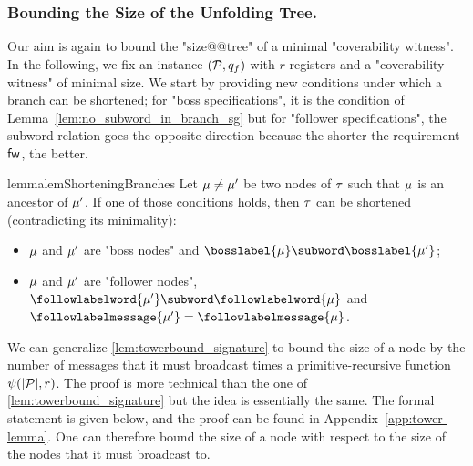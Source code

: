 \subsubsection{Bounding the Size of the Unfolding Tree.}
\label{sec:tree-bounds}

Our aim is again to bound the "size@@tree" of a minimal "coverability witness". In the following, we fix an instance $(\mathcal{P},q_f)$ with $r$ registers and a "coverability witness" of minimal size. We start by providing new conditions under which a branch can be shortened; for "boss specifications", it is the condition of Lemma~\ref{lem:no_subword_in_branch_sg} but for "follower specifications", the subword relation goes the opposite direction because the shorter the requirement $\mathsf{fw}$, the better.

\begin{restatable}{lemma}{lemShorteningBranches} 
\label{lem:shortening-branches}
	Let $\mu \ne \mu'$ be two nodes of $\tau$ such that $\mu$ is an ancestor of $\mu'$. If one of those conditions holds, then $\tau$ can be shortened  (contradicting its minimality):
	\begin{itemize}
	\item $\mu$ and $\mu'$ are "boss nodes" and $\bosslabel{\node} \subword \bosslabel{\node'}$; 
	\item $\mu$ and $\mu'$ are "follower nodes", $\followlabelword{\node'} \subword \followlabelword{\node}$ and $\followlabelmessage{\node'}=\followlabelmessage{\node}$.
	\end{itemize} 
\end{restatable}

We can generalize \cref{lem:towerbound_signature} to bound the size of a node by the number of messages that it must broadcast times a primitive-recursive function $\psi(|\mathcal{P}|,r)$. The proof is more technical than the one of \cref{lem:towerbound_signature} but the idea is essentially the same. The formal statement is given below, and the proof can be found in Appendix~\ref{app:tower-lemma}. 
One can therefore bound the size of a node with respect to the size of the nodes that it must broadcast to.

